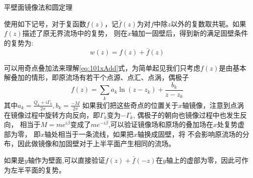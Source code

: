平壁面镜像法和圆定理

使用如下记号，对于复函数$f(z)$，记$\bar{f}(z)$为对$f$中除$z$以外的复数取共轭。如果$f(z)$描述了原无界流场中的复势，
则在$x$轴加一固壁后，得到新的满足固壁条件的复势为:
\begin{equation}\label{eq:101xAdd}
w(z)=f(z)+\bar{f}(z)
\end{equation}

可以用奇点叠加法来理解\eqref{eq:101xAdd}式，为简单起见我们只考虑$f(z)$是由基本解叠加的情形，即原流场有若干个点源、点汇、点涡，偶极子
\begin{equation}\label{eq:101xAdd}
f(z)=\sum_{k} a_k \ln(z-z_k)+ \frac{b_k}{z-z_k}
\end{equation}
其中$a_k=\frac{Q_k+i\Gamma_k}{2\pi},b_k=\frac{-M}{2\pi}$
如果我们把这些奇点的位置关于$x$轴镜像，注意到点涡在镜像过程中旋转方向反向，即$\Gamma_k$变为$-\Gamma_k$,
偶极子的朝向也镜像过程中也发生反向，
相当于$M=me^{i\beta}$变成了$me^{-i\beta}$,可以验证镜像场和原场的叠加场在$x$处复势虚部为零，
即$x$轴处相当于一条流线，如果把$x$轴换成固壁，将
不会影响原流场的分布，因此做镜像和加固壁对于上半平面产生相同的流场。

如果是$y$轴作为壁面,可以直接验证$f(z)+\bar{f}(-z)$在$y$轴上的虚部为零，因此可作为左半平面的复势。

